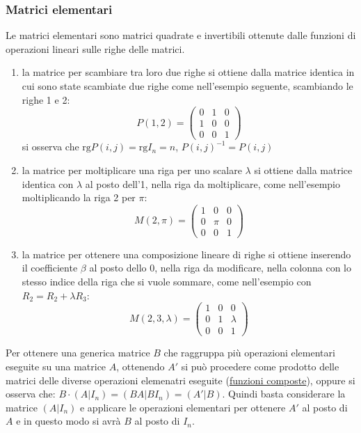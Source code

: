 \documentclass[a4paper]{article}
\newcommand\rg{\text{rg}} 		%
\begin{document}
\subsubsection*{Matrici elementari}
Le matrici elementari sono matrici quadrate e invertibili ottenute dalle funzioni di operazioni lineari sulle righe delle matrici.
\begin{enumerate}
	\item la matrice per scambiare tra loro due righe si ottiene dalla matrice identica in cui sono state scambiate due righe
	come nell'esempio seguente, scambiando le righe 1 e 2:
	\[P(1,2) = \begin{pmatrix}
		0 & 1 & 0 \\
		1 & 0 & 0 \\
		0 & 0 & 1
	\end{pmatrix}\]
	si osserva che \(\rg P(i,j) = \rg I_n = n\), \(P(i,j)^{-1} = P(i,j)\)
	
	\item la matrice per moltiplicare una riga per uno scalare \(\lambda\) si ottiene dalla matrice identica con \(\lambda\)
	al posto dell'1, nella riga da moltiplicare, come nell'esempio moltiplicando la riga 2 per \(\pi\):
	\[M(2,\pi) = \begin{pmatrix}
		1 & 0 & 0 \\
		0 & \pi & 0 \\
		0 & 0 & 1
	\end{pmatrix}\]
	
	\item la matrice per ottenere una composizione lineare di righe si ottiene inserendo il coefficiente \(\beta\) al posto
	dello 0, nella riga da modificare, nella colonna con lo stesso indice della riga che si vuole sommare, come nell'esempio
	con \(R_2 = R_2 + \lambda R_3\):
	\[M(2, 3, \lambda) = \begin{pmatrix}
		1 & 0 & 0 \\
		0 & 1 & \lambda \\
		0 & 0 & 1
	\end{pmatrix}\]
\end{enumerate}

Per ottenere una generica matrice \(B\) che raggruppa più operazioni elementari eseguite su una matrice \(A\), ottenendo \(A'\)
si può procedere come prodotto delle matrici delle diverse operazioni elemenatri eseguite (\hyperlink{composizioneFunzioniCambiamentiDiBase}{funzioni composte}),
oppure si osserva che: \(B \cdot (A|I_n) = (BA | BI_n) = (A'|B)\). Quindi basta considerare la matrice \((A|I_n)\) e applicare
le operazioni elementari per ottenere \(A'\) al posto di \(A\) e in questo modo si avrà \(B\) al posto di \(I_n\).
\end{document}
